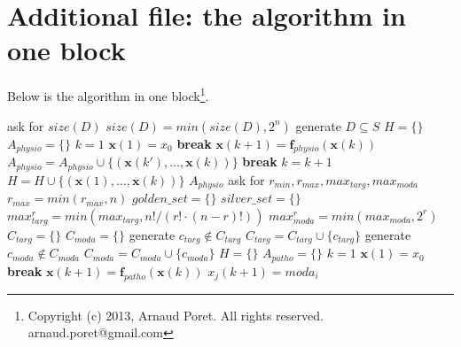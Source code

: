 \documentclass[notitlepage,oneside,onecolumn,a4paper]{article}
\begin{document}
\section*{Additional file: the algorithm in one block}
Below is the algorithm in one block\footnote{Copyright (c) 2013, Arnaud Poret. All rights reserved. arnaud.poret@gmail.com}.
\begin{algorithmic}[1]
\STATE ask for $size(D)$
\STATE $size(D)=min(size(D),2^n)$
\STATE generate $D\subseteq S$
\STATE $H=\lbrace \rbrace$
\STATE $A_{physio}=\lbrace \rbrace$
    \STATE $k=1$
    \STATE $\boldsymbol{x}(1)=x_0$
            \STATE \textbf{break}
        \ENDIF
        \STATE $\boldsymbol{x}(k+1)=\boldsymbol{f}_{physio}(\boldsymbol{x}(k))$
            \STATE $A_{physio}=A_{physio}\cup \lbrace (\boldsymbol{x}(k'),\dots ,\boldsymbol{x}(k))\rbrace$
            \STATE \textbf{break}
        \ENDIF
        \STATE $k=k+1$
    \ENDWHILE
    \STATE $H=H\cup \lbrace (\boldsymbol{x}(1),\dots ,\boldsymbol{x}(k))\rbrace$
\ENDFOR
\RETURN $A_{physio}$
\STATE ask for $r_{min},r_{max},max_{targ},max_{moda}$
\STATE $r_{max}=min(r_{max},n)$
\STATE $golden\_set=\lbrace \rbrace$
\STATE $silver\_set=\lbrace \rbrace$
    \STATE $max_{targ}^{r}=min(max_{targ},n!/(r!\cdot (n-r)!))$
    \STATE $max_{moda}^{r}=min(max_{moda},2^{r})$
    \STATE $C_{targ}=\lbrace \rbrace$
    \STATE $C_{moda}=\lbrace \rbrace$
        \STATE generate $c_{targ}\notin C_{targ}$
        \STATE $C_{targ}=C_{targ}\cup \lbrace c_{targ}\rbrace$
    \ENDWHILE
        \STATE generate $c_{moda}\notin C_{moda}$
        \STATE $C_{moda}=C_{moda}\cup \lbrace c_{moda}\rbrace$
    \ENDWHILE
            \STATE $H=\lbrace \rbrace$
            \STATE $A_{patho}=\lbrace \rbrace$
                \STATE $k=1$
                \STATE $\boldsymbol{x}(1)=x_0$
                        \STATE \textbf{break}
                    \ENDIF
                    \STATE $\boldsymbol{x}(k+1)=\boldsymbol{f}_{patho}(\boldsymbol{x}(k))$
                                \STATE $x_j(k+1)=moda_i$

\end{algorithmic}
\end{document}
